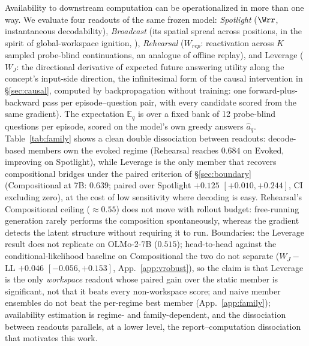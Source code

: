 Availability to downstream computation can be operationalized in more than one
way. We evaluate four readouts of the same frozen model: \emph{Spotlight}
($\Wrr$, instantaneous decodability), \emph{Broadcast} (its spatial spread across
positions, in the spirit of global-workspace ignition, \citealp{dehaene2011}),
\emph{Rehearsal} ($W_{rep}$: reactivation across $K$ sampled probe-blind
continuations, an analogue of offline replay), and Leverage ($W_J$: the
directional
derivative of expected future answering utility along the concept's input-side
direction, the infinitesimal form of the causal intervention in
\S\ref{sec:causal}, computed by backpropagation without training: one
forward-plus-backward pass per episode--question pair, with every candidate
scored from the same gradient). The expectation $\mathbb{E}_q$ is over a fixed
bank of 12 probe-blind questions per episode, scored on the model's own greedy
answers $\hat a_q$.
Table~\ref{tab:family} shows a clean double dissociation between readouts:
decode-based members own the evoked regime (Rehearsal reaches $0.684$ on Evoked,
improving on Spotlight), while Leverage is the only member that recovers
compositional bridges under the paired criterion of \S\ref{sec:boundary}
(Compositional at 7B: $0.639$; paired over Spotlight $+0.125$
$[+0.010, +0.244]$, CI excluding zero), at the cost of low sensitivity where decoding is easy. Rehearsal's Compositional
ceiling ($\approx 0.55$) does not move with rollout budget: free-running
generation rarely performs the composition spontaneously, whereas the gradient
detects the latent structure without requiring it to run. Boundaries: the Leverage result does not
replicate on OLMo-2-7B ($0.515$); head-to-head against the
conditional-likelihood baseline on Compositional the two do not separate
($W_J{-}$LL $+0.046$ $[-0.056, +0.153]$, App.~\ref{app:vrobust}), so the
claim is that Leverage is the only \emph{workspace} readout whose paired
gain over the static member is significant, not that it beats every
non-workspace score; and naive member ensembles do not beat the
per-regime best member (App.~\ref{app:family}); availability estimation is regime- and family-dependent, and the dissociation
between readouts parallels, at a lower level, the report--computation
dissociation that motivates this work.

